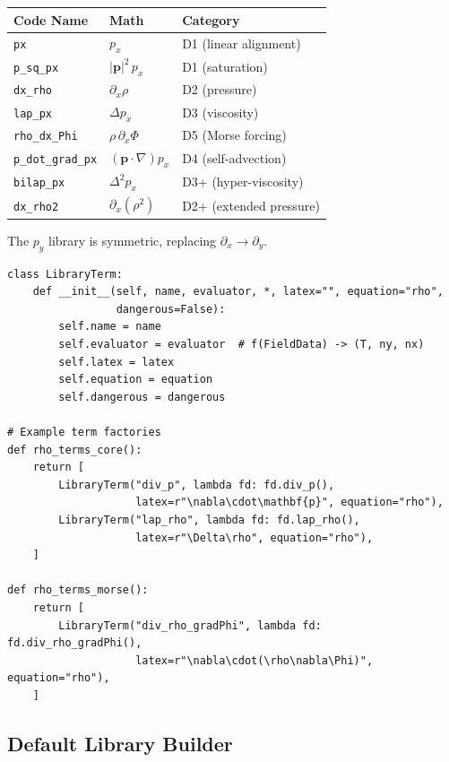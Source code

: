 \documentclass[11pt]{article}
\newcommand{\bp}{\mathbf{p}}
\begin{document}
\begin{center}
\begin{tabular}{lll}
\toprule
\textbf{Code Name} & \textbf{Math} & \textbf{Category} \\
\midrule
\texttt{px} & $p_x$ & D1 (linear alignment) \\
\texttt{p\_sq\_px} & $|\bp|^2\,p_x$ & D1 (saturation) \\
\texttt{dx\_rho} & $\partial_x\rho$ & D2 (pressure) \\
\texttt{lap\_px} & $\Delta p_x$ & D3 (viscosity) \\
\texttt{rho\_dx\_Phi} & $\rho\,\partial_x\Phi$ & D5 (Morse forcing) \\
\texttt{p\_dot\_grad\_px} & $(\bp\cdot\nabla)p_x$ & D4 (self-advection) \\
\texttt{bilap\_px} & $\Delta^2 p_x$ & D3+ (hyper-viscosity) \\
\texttt{dx\_rho2} & $\partial_x(\rho^2)$ & D2+ (extended pressure) \\
\bottomrule
\end{tabular}
\end{center}

The $p_y$ library is symmetric, replacing $\partial_x \to \partial_y$.

\begin{lstlisting}[caption={multifield.py --- Library term example}]
class LibraryTerm:
    def __init__(self, name, evaluator, *, latex="", equation="rho",
                 dangerous=False):
        self.name = name
        self.evaluator = evaluator  # f(FieldData) -> (T, ny, nx)
        self.latex = latex
        self.equation = equation
        self.dangerous = dangerous

# Example term factories
def rho_terms_core():
    return [
        LibraryTerm("div_p", lambda fd: fd.div_p(),
                    latex=r"\nabla\cdot\mathbf{p}", equation="rho"),
        LibraryTerm("lap_rho", lambda fd: fd.lap_rho(),
                    latex=r"\Delta\rho", equation="rho"),
    ]

def rho_terms_morse():
    return [
        LibraryTerm("div_rho_gradPhi", lambda fd: fd.div_rho_gradPhi(),
                    latex=r"\nabla\cdot(\rho\nabla\Phi)", equation="rho"),
    ]
\end{lstlisting}


\subsection{Default Library Builder}
\end{document}
